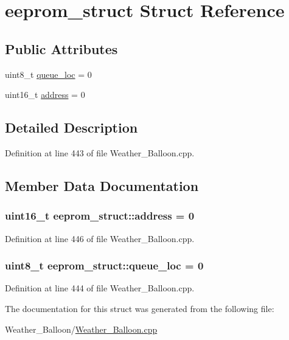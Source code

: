\hypertarget{structeeprom__struct}{}\section{eeprom\+\_\+struct Struct Reference}
\label{structeeprom__struct}
\subsection*{Public Attributes}
\begin{DoxyCompactItemize}
\item 
uint8\+\_\+t \hyperlink{structeeprom__struct_abdd1ffbd2d5cf7b991f6e0a7cd951c39}{queue\+\_\+loc} = 0
\item 
uint16\+\_\+t \hyperlink{structeeprom__struct_a9c95773929c39be73375f839d44050dd}{address} = 0
\end{DoxyCompactItemize}


\subsection{Detailed Description}


Definition at line 443 of file Weather\+\_\+\+Balloon.\+cpp.



\subsection{Member Data Documentation}
\subsubsection[{\texorpdfstring{address}{address}}]{\setlength{\rightskip}{0pt plus 5cm}uint16\+\_\+t eeprom\+\_\+struct\+::address = 0}\hypertarget{structeeprom__struct_a9c95773929c39be73375f839d44050dd}{}\label{structeeprom__struct_a9c95773929c39be73375f839d44050dd}


Definition at line 446 of file Weather\+\_\+\+Balloon.\+cpp.

\subsubsection[{\texorpdfstring{queue\+\_\+loc}{queue\_loc}}]{\setlength{\rightskip}{0pt plus 5cm}uint8\+\_\+t eeprom\+\_\+struct\+::queue\+\_\+loc = 0}\hypertarget{structeeprom__struct_abdd1ffbd2d5cf7b991f6e0a7cd951c39}{}\label{structeeprom__struct_abdd1ffbd2d5cf7b991f6e0a7cd951c39}


Definition at line 444 of file Weather\+\_\+\+Balloon.\+cpp.



The documentation for this struct was generated from the following file\+:\begin{DoxyCompactItemize}
\item 
Weather\+\_\+\+Balloon/\hyperlink{_weather___balloon_8cpp}{Weather\+\_\+\+Balloon.\+cpp}\end{DoxyCompactItemize}
